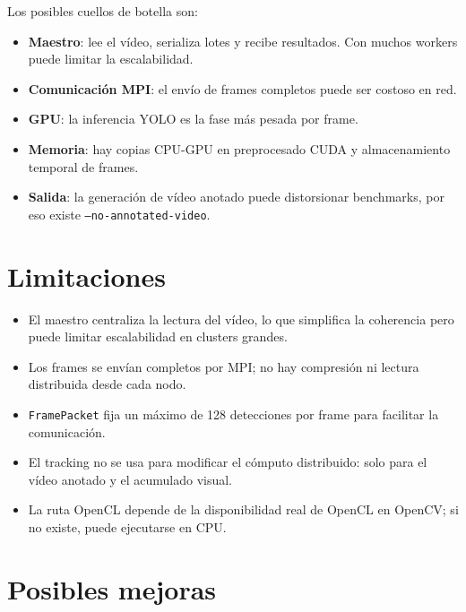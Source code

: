 \documentclass[12pt,a4paper]{article}
\begin{document}
Los posibles cuellos de botella son:

\begin{itemize}
    \item \textbf{Maestro}: lee el v\'ideo, serializa lotes y recibe resultados. Con muchos
    workers puede limitar la escalabilidad.
    \item \textbf{Comunicaci\'on MPI}: el env\'io de frames completos puede ser costoso en red.
    \item \textbf{GPU}: la inferencia YOLO es la fase m\'as pesada por frame.
    \item \textbf{Memoria}: hay copias CPU-GPU en preprocesado CUDA y almacenamiento temporal
    de frames.
    \item \textbf{Salida}: la generaci\'on de v\'ideo anotado puede distorsionar benchmarks, por
    eso existe \texttt{--no-annotated-video}.
\end{itemize}

\section{Limitaciones}

\begin{itemize}
    \item El maestro centraliza la lectura del v\'ideo, lo que simplifica la coherencia pero
    puede limitar escalabilidad en clusters grandes.
    \item Los frames se env\'ian completos por MPI; no hay compresi\'on ni lectura distribuida
    desde cada nodo.
    \item \texttt{FramePacket} fija un m\'aximo de 128 detecciones por frame para facilitar la
    comunicaci\'on.
    \item El tracking no se usa para modificar el c\'omputo distribuido: solo para el v\'ideo
    anotado y el acumulado visual.
    \item La ruta OpenCL depende de la disponibilidad real de OpenCL en OpenCV; si no existe,
    puede ejecutarse en CPU.
\end{itemize}

\section{Posibles mejoras}
\end{document}
